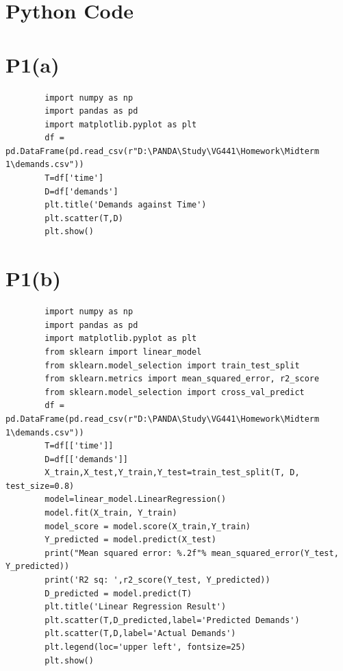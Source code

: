 \documentclass[a4paper]{article}
\begin{document}
\section*{Python Code}
\section*{P1(a)}
    \begin{verbatim}
        import numpy as np
        import pandas as pd
        import matplotlib.pyplot as plt
        df = pd.DataFrame(pd.read_csv(r"D:\PANDA\Study\VG441\Homework\Midterm 1\demands.csv"))
        T=df['time']
        D=df['demands']
        plt.title('Demands against Time')
        plt.scatter(T,D)
        plt.show()
    \end{verbatim}
\section*{P1(b)}
    \begin{verbatim}
        import numpy as np
        import pandas as pd
        import matplotlib.pyplot as plt
        from sklearn import linear_model
        from sklearn.model_selection import train_test_split
        from sklearn.metrics import mean_squared_error, r2_score
        from sklearn.model_selection import cross_val_predict
        df = pd.DataFrame(pd.read_csv(r"D:\PANDA\Study\VG441\Homework\Midterm 1\demands.csv"))
        T=df[['time']]
        D=df[['demands']]
        X_train,X_test,Y_train,Y_test=train_test_split(T, D, test_size=0.8)
        model=linear_model.LinearRegression()
        model.fit(X_train, Y_train)
        model_score = model.score(X_train,Y_train)
        Y_predicted = model.predict(X_test)
        print("Mean squared error: %.2f"% mean_squared_error(Y_test, Y_predicted))
        print('R2 sq: ',r2_score(Y_test, Y_predicted))
        D_predicted = model.predict(T)
        plt.title('Linear Regression Result')
        plt.scatter(T,D_predicted,label='Predicted Demands')
        plt.scatter(T,D,label='Actual Demands')
        plt.legend(loc='upper left', fontsize=25)
        plt.show()
    \end{verbatim}
\end{document}
